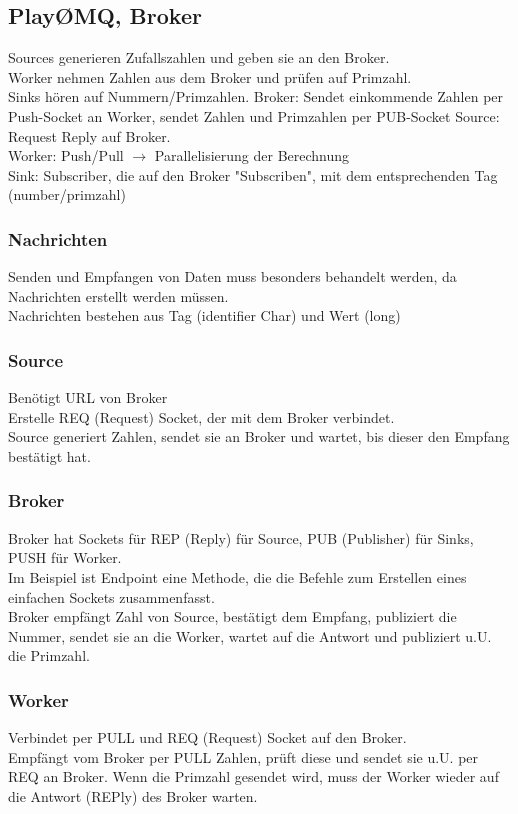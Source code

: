 \documentclass[a4paper]{article}
\begin{document}
\subsection{PlayØMQ, Broker}
Sources generieren Zufallszahlen und geben sie an den Broker.\\
Worker nehmen Zahlen aus dem Broker und prüfen auf Primzahl.\\
Sinks hören auf Nummern/Primzahlen.
Broker: Sendet einkommende Zahlen per Push-Socket an Worker, sendet Zahlen und Primzahlen per PUB-Socket
Source: Request Reply auf Broker.\\
Worker: Push/Pull $\rightarrow$ Parallelisierung der Berechnung \\
Sink: Subscriber, die auf den Broker "Subscriben", mit dem entsprechenden Tag (number/primzahl)
\subsubsection{Nachrichten}
Senden und Empfangen von Daten muss besonders behandelt werden, da Nachrichten erstellt werden müssen.\\
Nachrichten bestehen aus Tag (identifier Char) und Wert (long)
\subsubsection{Source}
Benötigt URL von Broker\\
Erstelle REQ (Request) Socket, der mit dem Broker verbindet.\\
Source generiert Zahlen, sendet sie an Broker und wartet, bis dieser den Empfang bestätigt hat.
\subsubsection{Broker}
Broker hat Sockets für REP (Reply) für Source, PUB (Publisher) für Sinks, PUSH für Worker.\\
Im Beispiel ist Endpoint eine Methode, die die Befehle zum Erstellen eines einfachen Sockets zusammenfasst.\\
Broker empfängt Zahl von Source, bestätigt dem Empfang, publiziert die Nummer, sendet sie an die Worker, wartet auf die Antwort und publiziert u.U. die Primzahl.
\subsubsection{Worker}
Verbindet per PULL und REQ (Request) Socket auf den Broker. \\
Empfängt vom Broker per PULL Zahlen, prüft diese und sendet sie u.U. per REQ an Broker. Wenn die Primzahl gesendet wird, muss der Worker wieder auf die Antwort (REPly) des Broker warten.
\end{document}
